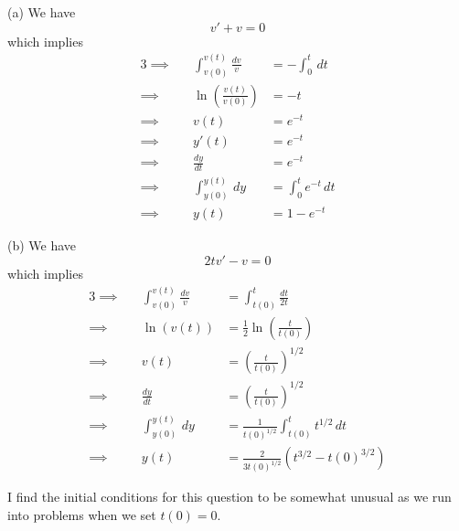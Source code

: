 \documentclass[a4paper]{article}
\begin{document}
(a) We have
\[
	v' + v = 0
\]
which implies
\begin{alignat*}{3}
	\implies && \int^{v \!\left( t \right) }_{v \!\left( 0 \right) } \frac{dv }{v} & = -\int^{t}_{0}  \, dt  \\
	\implies && \ln\left( \frac{v \!\left( t \right) }{v \!\left( 0 \right) } \right) & = -t \\ 
	\implies && v \!\left( t \right) & = e^{-t} \\
	\implies && y'\!\left( t \right) & = e^{-t} \\
	\implies && \frac{d y}{d t} & = e^{-t} \\
	\implies && \int^{y \!\left( t \right) }_{y \!\left( 0 \right) }  \, dy & = \int^{t}_{0} e^{-t} \, dt \\
	\implies && y \!\left( t \right) & = 1 - e^{-t}
\end{alignat*}

(b) We have
\[
	2tv' - v = 0
\]
which implies
\begin{alignat*}{3}
	\implies && \int^{v \!\left( t \right) }_{v \!\left( 0 \right) } \frac{dv }{v} & = \int^{t}_{t \!\left( 0 \right) } \frac{dt}{2t} \\
	\implies && \ln\left( v \!\left( t \right)  \right) & = \frac{1}{2} \ln\left( \frac{t}{t \!\left( 0 \right) } \right) \\ 
	\implies && v \!\left( t \right) & = \!\left( \frac{t}{t \!\left( 0 \right) } \right)^{1/2} \\
	\implies && \frac{d y}{d t} & = \!\left( \frac{t}{t \!\left( 0 \right) } \right)^{1/2} \\
	\implies && \int^{y \!\left( t \right) }_{y \!\left( 0 \right) }  \, dy & = \frac{1}{t \!\left( 0 \right)^{1/2}} \int^{t}_{t \!\left( 0 \right) } t^{1/2} \, dt \\
	\implies && y \!\left( t \right) & = \frac{2}{3t \!\left( 0 \right)^{1/2}} \!\left( t^{3/2} - t \!\left( 0 \right)^{3/2} \right)  
\end{alignat*}

I find the initial conditions for this question to be somewhat unusual as we run into problems when we set \(t \!\left( 0 \right) = 0\).

\end{document}

